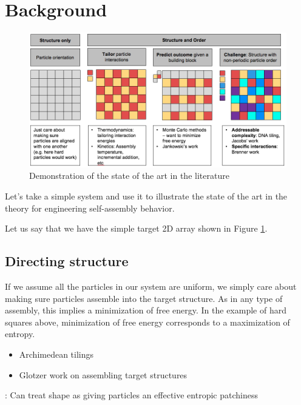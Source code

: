 \section{Background}

\begin{figure}[t]
\begin{center}
\includegraphics[width=6.5in]{../figures/litreview.png}
\caption{Demonstration of the state of the art in the literature}
\label{fig:litreview}
\end{center}
\end{figure}

Let's take a simple system and use it to illustrate the state of the art in the theory for engineering self-assembly behavior.

Let us say that we have the simple target 2D array shown in Figure \ref{fig:litreview}.

\subsection{Directing structure}
If we assume all the particles in our system are uniform, we simply care about making sure particles assemble into the target structure.
As in any type of assembly, this implies a minimization of free energy.
In the example of hard squares above, minimization of free energy corresponds to a maximization of entropy.

\begin{itemize}
\item Archimedean tilings
\item Glotzer work on assembling target structures
\end{itemize}


\cite{vanAnders_2014_ACSNano}: Can treat shape as giving particles an effective entropic patchiness

